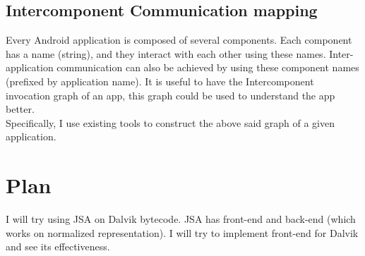 \documentclass[12pt]{article}
\begin{document}
\subsection{Intercomponent Communication mapping}
Every Android application is composed of several components. Each component has a name (string), and they interact with each other using these names. Inter-application communication can also be achieved by using these component names (prefixed by application name). It is useful to have the Intercomponent invocation graph of an app, this graph could be used to understand the app better.\\

Specifically, I use existing tools to construct the above said graph of a given application.

\section{Plan}
I will try using JSA on Dalvik bytecode. JSA has front-end and back-end (which works on normalized representation). I will try to implement front-end for Dalvik and see its effectiveness.


\end{document}

